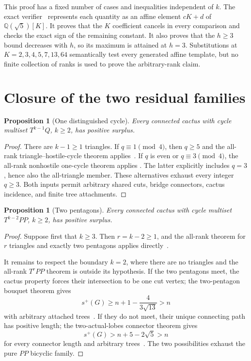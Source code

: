 \documentclass[11pt]{article}
\newtheorem{proposition}[theorem]{Proposition}
\newcommand{\splus}{s^+}
\begin{document}
This proof has a fixed number of cases and inequalities independent of $k$.
The exact verifier~\cite{Frontier} represents each quantity as an affine
element $cK+d$ of $\mathbb Q(\sqrt5)[K]$.  It proves that the $K$ coefficient
cancels in every comparison and checks the exact sign of the remaining
constant.  It also proves that the $h\geq3$ bound decreases with $h$, so its
maximum is attained at $h=3$.  Substitutions at
$K=2,3,4,5,7,13,64$ semantically test every generated affine template, but no
finite collection of ranks is used to prove the arbitrary-rank claim.

\section{Closure of the two residual families}

\begin{proposition}[One distinguished cycle]\label{prop:q}
Every connected cactus with cycle multiset $T^{k-1}Q$, $k\geq2$, has positive
surplus.
\end{proposition}

\begin{proof}
There are $k-1\geq1$ triangles.  If $q\equiv1\pmod4$, then $q\geq5$ and the
all-rank triangle--hostile-cycle theorem applies~\cite{Hostile}.  If $q$ is
even or $q\equiv3\pmod4$, the all-rank nonhostile one-cycle theorem applies
\cite{Nonhostile}.  The latter explicitly includes $q=3$, hence also the
all-triangle member.  These alternatives exhaust every integer $q\geq3$.
Both inputs permit arbitrary shared cuts, bridge connectors, cactus incidence,
and finite tree attachments.
\end{proof}

\begin{proposition}[Two pentagons]\label{prop:pp}
Every connected cactus with cycle multiset $T^{k-2}PP$, $k\geq2$, has positive
surplus.
\end{proposition}

\begin{proof}
Suppose first that $k\geq3$.  Then $r=k-2\geq1$, and the all-rank theorem for
$r$ triangles and exactly two pentagons applies directly~\cite{TwoPent}.

It remains to respect the boundary $k=2$, where there are no triangles and the
all-rank $T^rPP$ theorem is outside its hypothesis.  If the two pentagons meet,
the cactus property forces their intersection to be one cut vertex; the
two-pentagon bouquet theorem gives
\[
 \splus(G)\geq n+1-\frac4{3\sqrt{13}}>n
\]
with arbitrary attached trees~\cite{Bouquet}.  If they do not meet, their
unique connecting path has positive length; the two-actual-lobes connector
theorem gives
\[
 \splus(G)>n+5-2\sqrt5>n
\]
for every connector length and arbitrary trees~\cite{Connector}.  The two
possibilities exhaust the pure $PP$ bicyclic family.
\end{proof}
\end{document}
